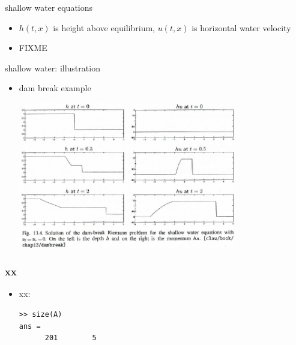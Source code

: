 \documentclass[10pt,hyperref]{beamer}
\begin{document}
\begin{frame}{shallow water equations}

\begin{itemize}
\item $h(t,x)$ is height above equilibrium, $u(t,x)$ is horizontal water velocity
\item FIXME
\end{itemize}
\end{frame}


\begin{frame}{shallow water: illustration}

\begin{itemize}
\item dam break example

\hfill \includegraphics[width=0.75\textwidth]{figs/leveque13p4}

\end{itemize}
\end{frame}


\begin{frame}[fragile]
\frametitle{xx}

\begin{itemize}
\item xx:

\medskip
\begin{Verbatim}[fontsize=\scriptsize]
>> size(A)
ans =
      201        5
\end{Verbatim}

\end{itemize}
\end{frame}
\end{document}
